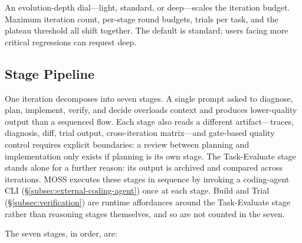 \documentclass{article}
\begin{document}
An evolution-depth dial---light, standard, or deep---scales the iteration budget. Maximum iteration count, per-stage round budgets, trials per task, and the plateau threshold all shift together. The default is standard; users facing more critical regressions can request deep.

\subsection{Stage Pipeline}
\label{subsec:stage-pipeline}

One iteration decomposes into seven stages. A single prompt asked to diagnose, plan, implement, verify, and decide overloads context and produces lower-quality output than a sequenced flow. Each stage also reads a different artifact---traces, diagnosis, diff, trial output, cross-iteration matrix---and gate-based quality control requires explicit boundaries: a review between planning and implementation only exists if planning is its own stage. The Task-Evaluate stage stands alone for a further reason: its output is archived and compared across iterations. MOSS executes these stages in sequence by invoking a coding-agent CLI (\S\ref{subsec:external-coding-agent}) once at each stage. Build and Trial (\S\ref{subsec:verification}) are runtime affordances around the Task-Evaluate stage rather than reasoning stages themselves, and so are not counted in the seven.

The seven stages, in order, are:
\end{document}
